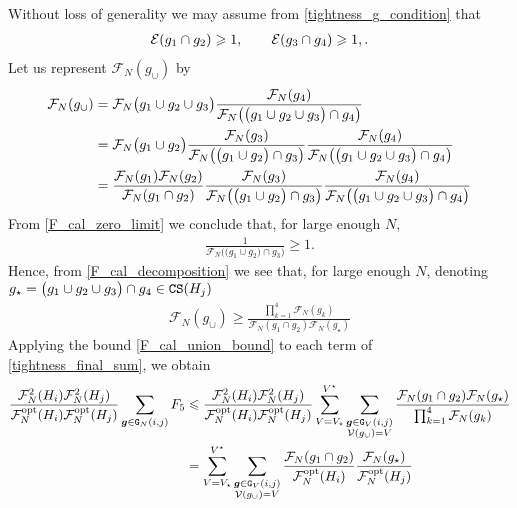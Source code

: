 \documentclass[11pt,reqno]{amsart}
\numberwithin{equation}{section}
\newcommand{\kb}[1]{\boldsymbol{#1}}
\newcommand{\vk}[1]{\kb{#1}}
\begin{document}
Without loss of generality we may assume from \eqref{tightness_g_condition} that
\begin{align}
    \mathcal{E}(g_1\cap g_2)\geqslant 1,\qquad \mathcal{E}(g_3\cap g_4)\geqslant 1,\notag.
\end{align}
Let us represent $\mathcal{F}_N(g_{\cup})$ by
\begin{align}
    \mathcal{F}_N(g_{\cup}) &= \mathcal{F}_N\bigl(g_1\cup g_2\cup g_3\bigr)\frac{\mathcal{F}_N(g_4)}{\mathcal{F}_N\bigl(\bigl(g_1\cup g_2\cup g_3\bigr)\cap g_4\bigr)}\notag\\
    &= \mathcal{F}_N\bigl(g_1\cup g_2\bigr)\frac{\mathcal{F}_N(g_3)}{\mathcal{F}_N\bigl(\bigl(g_1\cup g_2\bigr)\cap g_3\bigr)}\frac{\mathcal{F}_N(g_4)}{\mathcal{F}_N\bigl(\bigl(g_1\cup g_2\cup g_3\bigr)\cap g_4\bigr)}\notag\\
    &= \frac{\mathcal{F}_N(g_1)\mathcal{F}_{N}(g_2)}{\mathcal{F}_N(g_1\cap g_2)}\frac{\mathcal{F}_N(g_3)}{\mathcal{F}_N\bigl(\bigl(g_1\cup g_2\bigr)\cap g_3\bigr)}\frac{\mathcal{F}_N(g_4)}{\mathcal{F}_N\bigl(\bigl(g_1\cup g_2\cup g_3\bigr)\cap g_4\bigr)}\label{F_cal_decomposition}
\end{align}
From \eqref{F_cal_zero_limit} we conclude that, for large enough $N$,
\begin{align*}
    \frac{1}{\mathcal{F}_N\bigl(\bigl(g_1\cup g_2\bigr)\cap g_3\bigr)}\geqslant 1.
\end{align*}
Hence, from \eqref{F_cal_decomposition} we see that, for large enough $N$, denoting $g_{\star} = \bigl(g_1\cup g_2\cup g_3\bigr)\cap g_4\in{\tt CS}({H}_j)$
\begin{align}
    \mathcal{F}_N(g_{\cup})\geqslant  \frac{\prod_{k=1}^{4}\mathcal{F}_N(g_k)}{\mathcal{F}_N(g_1\cap g_2)\mathcal{F}_N(g_{\star})}\label{F_cal_union_bound}
\end{align}
Applying the bound \eqref{F_cal_union_bound} to each term of \eqref{tightness_final_sum}, we obtain 
\begin{align}
     \frac{\mathcal{F}_N^2({H}_i)\mathcal{F}_N^2({H}_j)}{\mathcal{F}^{\rm opt}_N({H}_i)\mathcal{F}^{\rm opt}_N({H}_j)}\sum_{\vk g\in{\tt G}_{N}(i,j)} F_5&\leqslant \frac{\mathcal{F}_N^2({H}_i)\mathcal{F}_N^2({H}_j)}{\mathcal{F}^{\rm opt}_N({H}_i)\mathcal{F}^{\rm opt}_N({H}_j)}\sum_{V=V_{\star}}^{V^{\star}}\sum_{\substack{\vk g\in{\tt G}_{V}(i,j) \\ \mathcal{V}(g_{\cup}) = V}}\frac{\mathcal{F}_N(g_1\cap g_2)\mathcal{F}_N(g_{\star})}{\prod_{k=1}^{4}\mathcal{F}_N(g_k)}\\
     &= \sum_{V=V_{\star}}^{V^{\star}}\sum_{\substack{\vk g\in{\tt G}_{V}(i,j) \\ \mathcal{V}(g_{\cup}) = V}}\frac{\mathcal{F}_N(g_1\cap g_2)}{\mathcal{F}^{\rm opt}_N({H}_i)}\frac{\mathcal{F}_N(g_{\star})}{\mathcal{F}^{\rm opt}_N({H}_j)}\label{F_cal_decomposition_2}
\end{align}
\end{document}
